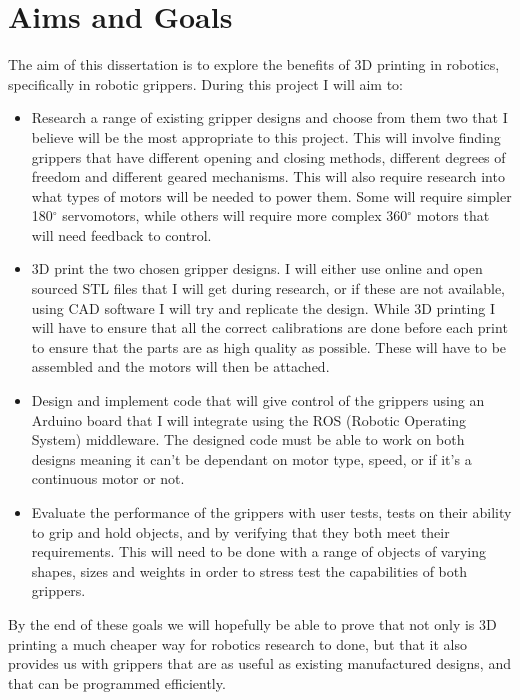 \documentclass{l4proj}
\begin{document}
\section{Aims and Goals}
The aim of this dissertation is to explore the benefits of 3D printing in robotics, specifically in robotic grippers. During this project I will aim to:

\begin{itemize}
    \item
    Research a range of existing gripper designs and choose from them two that I believe will be the most appropriate to this project. This will involve finding grippers that have different opening and closing methods, different degrees of freedom and different geared mechanisms. This will also require research into what types of motors will be needed to power them. Some will require simpler 180$^{\circ}$ servomotors, while others will require more complex 360$^{\circ}$ motors that will need feedback to control.
    \item
    3D print the two chosen gripper designs. I will either use online and open sourced STL files that I will get during research, or if these are not available, using CAD software I will try and replicate the design. While 3D printing I will have to ensure that all the correct calibrations are done before each print to ensure that the parts are as high quality as possible. These will have to be assembled and the motors will then be attached.
    \item
    Design and implement code that will give control of the grippers using an Arduino board that I will integrate using the ROS (Robotic Operating System) middleware. The designed code must be able to work on both designs meaning it can't be dependant on motor type, speed, or if it's a continuous motor or not. 
    \item
    Evaluate the performance of the grippers with user tests, tests on their ability to grip and hold objects, and by verifying that they both meet their requirements. This will need to be done with a range of objects of varying shapes, sizes and weights in order to stress test the capabilities of both grippers. 
\end{itemize}

By the end of these goals we will hopefully be able to prove that not only is 3D printing a much cheaper way for robotics research to done, but that it also provides us with grippers that are as useful as existing manufactured designs, and that can be programmed efficiently.
\end{document}
